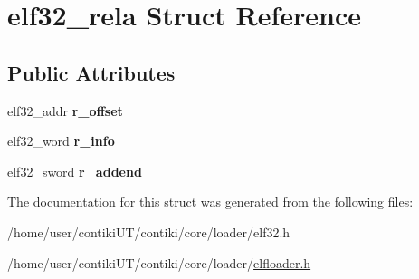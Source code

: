 \hypertarget{structelf32__rela}{}\section{elf32\+\_\+rela Struct Reference}
\label{structelf32__rela}
\subsection*{Public Attributes}
\begin{DoxyCompactItemize}
\item 
\hypertarget{structelf32__rela_a4ef1961410f1b9ffea15615e03b3917b}{}elf32\+\_\+addr {\bfseries r\+\_\+offset}\label{structelf32__rela_a4ef1961410f1b9ffea15615e03b3917b}

\item 
\hypertarget{structelf32__rela_a4c3494d4b7abfec309895dff1891a466}{}elf32\+\_\+word {\bfseries r\+\_\+info}\label{structelf32__rela_a4c3494d4b7abfec309895dff1891a466}

\item 
\hypertarget{structelf32__rela_a37fce330c497dba2ca15c69cc58b83b8}{}elf32\+\_\+sword {\bfseries r\+\_\+addend}\label{structelf32__rela_a37fce330c497dba2ca15c69cc58b83b8}

\end{DoxyCompactItemize}


The documentation for this struct was generated from the following files\+:\begin{DoxyCompactItemize}
\item 
/home/user/contiki\+U\+T/contiki/core/loader/elf32.\+h\item 
/home/user/contiki\+U\+T/contiki/core/loader/\hyperlink{elfloader_8h}{elfloader.\+h}\end{DoxyCompactItemize}
